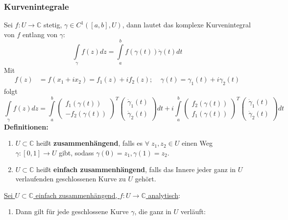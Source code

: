 \documentclass[4pt,a4paper]{scrartcl}
\begin{document}
\begin{multicols}{4}
\subsubsection{Kurvenintegrale}
Sei $f:U\rightarrow\mathbb{C}$ stetig, $\gamma\in C^1([a,b],U)$, dann lautet das komplexe Kurvenintegral von $f$ entlang von $\gamma$:
\begin{equation*}
\int\limits_{\gamma}f(z)dz=\int\limits_a^bf(\gamma(t))\dot{\gamma}(t)dt
\end{equation*}
Mit
\begin{equation*}
\begin{split}
f(z)&=f(x_1+ix_2)=f_1(z)+if_2(z);\;\;\;\;\gamma(t)=\gamma_1(t)+i\gamma_2(t)
\end{split}
\end{equation*}
folgt
\begin{equation*}
\int\limits_{\gamma}f(z)dz=\int\limits_a^b\begin{pmatrix}f_1(\gamma(t)) \\ -f_2(\gamma(t))\end{pmatrix}^T \begin{pmatrix}\dot{\gamma}_1(t) \\ \dot{\gamma}_2(t)\end{pmatrix} dt+i\int\limits_a^b\begin{pmatrix}f_2(\gamma(t)) \\ f_1(\gamma(t))\end{pmatrix}^T \begin{pmatrix}\dot{\gamma}_1(t) \\ \dot{\gamma}_2(t)\end{pmatrix}dt
\end{equation*}
\textbf{Definitionen:}
\begin{enumerate}[label=$\bullet$]
\item $U\subset\mathbb{C}$ heißt \textbf{zusammenhängend}, falls es $\forall\;z_1,z_2\in U$ einen Weg $\gamma:[0,1]\rightarrow U$ gibt, sodass $\gamma(0)=z_1,\gamma(1)=z_2$.
\item $U\subset\mathbb{C}$ heißt \textbf{einfach zusammenhängend}, falls das Innere jeder ganz in $U$ verlaufenden geschlossenen Kurve zu $U$ gehört.
\end{enumerate}
\underline{Sei $U\subset\mathbb{C}$ einfach zusammenhängend, $f:U\rightarrow\mathbb{C}$ analytisch}:
\begin{enumerate}[label=$\bullet$]
\item Dann gilt für jede geschlossene Kurve $\gamma$, die ganz in $U$ verläuft:
\begin{equation*}

\end{equation*}
\end{enumerate}
\end{multicols}
\end{document}
